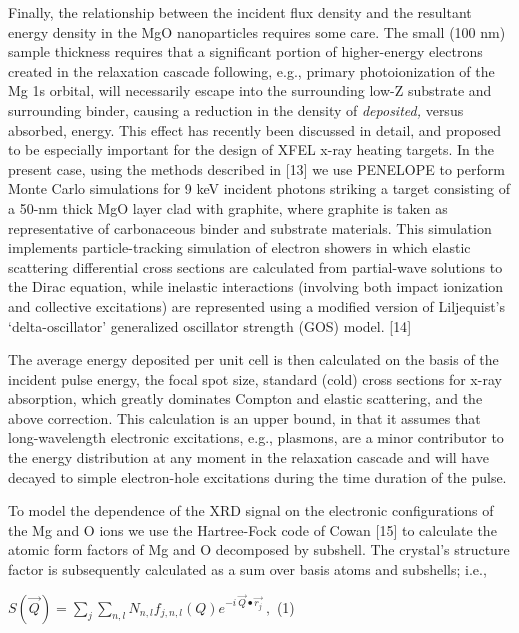 Finally, the relationship between the incident flux density and the
resultant energy density in the MgO nanoparticles requires some care.
The small (100 nm) sample thickness requires that a significant portion
of higher-energy electrons created in the relaxation cascade following,
e.g., primary photoionization of the Mg 1s orbital, will necessarily
escape into the surrounding low-Z substrate and surrounding binder,
causing a reduction in the density of \emph{deposited,} versus absorbed,
energy. This effect has recently been discussed in detail, and proposed
to be especially important for the design of XFEL x-ray heating targets.
In the present case, using the methods described in {[}13{]} we use
PENELOPE to perform Monte Carlo simulations for 9 keV incident photons
striking a target consisting of a 50-nm thick MgO layer clad with
graphite, where graphite is taken as representative of carbonaceous
binder and substrate materials. This simulation implements
particle-tracking simulation of electron showers in which elastic
scattering differential cross sections are calculated from partial-wave
solutions to the Dirac equation, while inelastic interactions (involving
both impact ionization and collective excitations) are represented using
a modified version of Liljequist's `delta-oscillator' generalized
oscillator strength (GOS) model. {[}14{]}

The average energy deposited per unit cell is then calculated on the
basis of the incident pulse energy, the focal spot size, standard (cold)
cross sections for x-ray absorption, which greatly dominates Compton and
elastic scattering, and the above correction. This calculation is an
upper bound, in that it assumes that long-wavelength electronic
excitations, e.g., plasmons, are a minor contributor to the energy
distribution at any moment in the relaxation cascade and will have
decayed to simple electron-hole excitations during the time duration of
the pulse.

To model the dependence of the XRD signal on the electronic
configurations of the Mg and O ions we use the Hartree-Fock code of
Cowan {[}15{]} to calculate the atomic form factors of Mg and O
decomposed by subshell. The crystal's structure factor is subsequently
calculated as a sum over basis atoms and subshells; i.e.,

\(S\left( \overrightarrow{Q} \right) = \sum_{j}^{}{\sum_{n,l}N_{n,l}f_{j,n,l}\left( Q \right)e^{- i\ \overrightarrow{Q} \bullet \overrightarrow{r_{j}}}\ },\)
(1)

